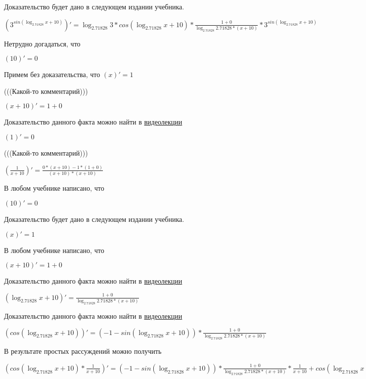\documentclass[12pt,a4paper,fleqn]{article}
\theoremstyle{definition}
\begin{document}
Доказательство будет дано в следующем издании учебника.

$({ 3 }^{sin(\log_{ 2.71828 }{ x  +  10 })})' = \log_{ 2.71828 }{ 3 } * cos(\log_{ 2.71828 }{ x  +  10 }) * \frac{ 1  +  0 }{\log_{ 2.71828 }{ 2.71828 } * ( x  +  10 )}
 * { 3 }^{sin(\log_{ 2.71828 }{ x  +  10 })}$

Нетрудно догадаться, что

$( 10 )' =  0 $

Примем без доказательства, что
$( x )' =  1 $

(((Какой-то комментарий)))

$( x  +  10 )' =  1  +  0 $

Доказательство данного факта можно найти в \href{https://www.youtube.com/watch?v=dQw4w9WgXcQ}{видеолекции}

$( 1 )' =  0 $

(((Какой-то комментарий)))

$(\frac{ 1 }{ x  +  10 }
)' = \frac{ 0  * ( x  +  10 ) -  1  * ( 1  +  0 )}{( x  +  10 ) * ( x  +  10 )}
$

В любом учебнике написано, что

$( 10 )' =  0 $

Доказательство будет дано в следующем издании учебника.

$( x )' =  1 $

В любом учебнике написано, что

$( x  +  10 )' =  1  +  0 $

Доказательство данного факта можно найти в \href{https://www.youtube.com/watch?v=dQw4w9WgXcQ}{видеолекции}

$(\log_{ 2.71828 }{ x  +  10 })' = \frac{ 1  +  0 }{\log_{ 2.71828 }{ 2.71828 } * ( x  +  10 )}
$

Доказательство данного факта можно найти в \href{https://www.youtube.com/watch?v=dQw4w9WgXcQ}{видеолекции}

$(cos(\log_{ 2.71828 }{ x  +  10 }))' = ( -1  - sin(\log_{ 2.71828 }{ x  +  10 })) * \frac{ 1  +  0 }{\log_{ 2.71828 }{ 2.71828 } * ( x  +  10 )}
$

В результате простых рассуждений можно получить

$(cos(\log_{ 2.71828 }{ x  +  10 }) * \frac{ 1 }{ x  +  10 }
)' = ( -1  - sin(\log_{ 2.71828 }{ x  +  10 })) * \frac{ 1  +  0 }{\log_{ 2.71828 }{ 2.71828 } * ( x  +  10 )}
 * \frac{ 1 }{ x  +  10 }
 + cos(\log_{ 2.71828 }{ x  +  10 }) * \frac{ 0  * ( x  +  10 ) -  1  * ( 1  +  0 )}{( x  +  10 ) * ( x  +  10 )}
$
\end{document}
